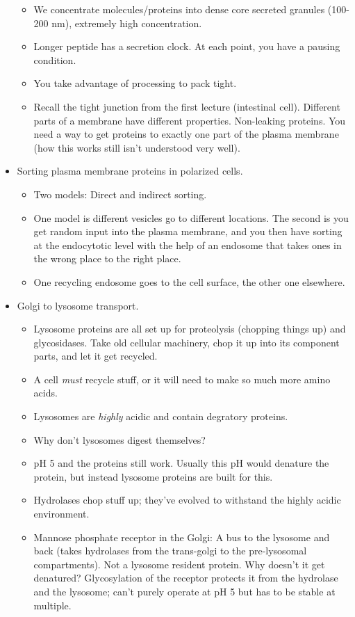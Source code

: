 \documentclass[../notes.tex]{subfiles}
\begin{document}
\begin{itemize}
\begin{itemize}
        \item We concentrate molecules/proteins into dense core secreted granules (100-200 nm), extremely high concentration.
        \item Longer peptide has a secretion clock. At each point, you have a pausing condition.
        \item You take advantage of processing to pack tight.
        \item Recall the tight junction from the first lecture (intestinal cell). Different parts of a membrane have different properties. Non-leaking proteins. You need a way to get proteins to exactly one part of the plasma membrane (how this works still isn't understood very well).
    \end{itemize}
    \item Sorting plasma membrane proteins in polarized cells.
    \begin{itemize}
        \item Two models: Direct and indirect sorting.
        \item One model is different vesicles go to different locations. The second is you get random input into the plasma membrane, and you then have sorting at the endocytotic level with the help of an endosome that takes ones in the wrong place to the right place.
        \item One recycling endosome goes to the cell surface, the other one elsewhere.
    \end{itemize}
    \item Golgi to lysosome transport.
    \begin{itemize}
        \item Lysosome proteins are all set up for proteolysis (chopping things up) and glycosidases. Take old cellular machinery, chop it up into its component parts, and let it get recycled.
        \item A cell \emph{must} recycle stuff, or it will need to make so much more amino acids.
        \item Lysosomes are \emph{highly} acidic and contain degratory proteins.
        \item Why don't lysosomes digest themselves?
        \item pH 5 and the proteins still work. Usually this pH would denature the protein, but instead lysosome proteins are built for this.
        \item Hydrolases chop stuff up; they've evolved to withstand the highly acidic environment.
        \item Mannose phosphate receptor in the Golgi: A bus to the lysosome and back (takes hydrolases from the trans-golgi to the pre-lysosomal compartments). Not a lysosome resident protein. Why doesn't it get denatured? Glycosylation of the receptor protects it from the hydrolase and the lysosome; can't purely operate at pH 5 but has to be stable at multiple.

\end{itemize}
\end{itemize}
\end{document}
